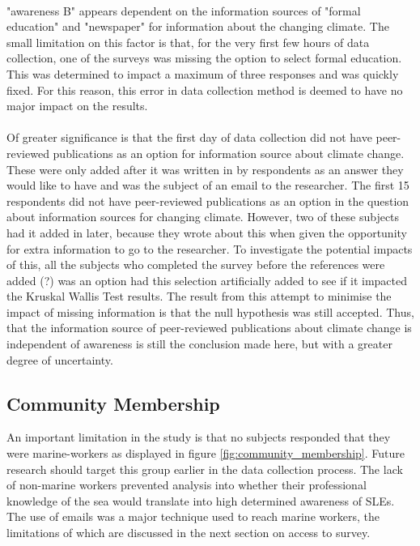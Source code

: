 \paragraph{}
"awareness B" appears dependent on the information sources of "formal education" and "newspaper" for information about the changing climate. The small limitation on this factor is that, for the very first few hours of data collection, one of the surveys was missing the option to select formal education. This was determined to impact a maximum of three responses and was quickly fixed. For this reason, this error in data collection method is deemed to have no major impact on the results. 
\paragraph{}
Of greater significance is that the first day of data collection did not have peer-reviewed publications as an option for information source about climate change. These were only added after it was written in by respondents as an answer they would like to have and was the subject of an email to the researcher.  The first 15 respondents did not have peer-reviewed publications as an option in the question about information sources for changing climate. However, two of these subjects had it added in later, because they wrote about this when given the opportunity for extra information to go to the researcher. To investigate the potential impacts of this, all the subjects who completed the survey before the references were added (?) was an option had this selection artificially added to see if it impacted the Kruskal Wallis Test results. The result from this attempt to minimise the impact of missing information is that the null hypothesis was still accepted. Thus, that the information source of peer-reviewed publications about climate change is independent of awareness is still the conclusion made here, but with a greater degree of uncertainty.
\paragraph{}


\subsection{Community Membership}
An important limitation in the study is that no subjects responded that they were marine-workers as displayed in figure \ref{fig:community_membership}. Future research should target this group earlier in the data collection process. The lack of non-marine workers prevented analysis into whether their professional knowledge of the sea would translate into high determined awareness of SLEs. The use of emails was a major technique used to reach marine workers, the limitations of which are discussed in the next section on access to survey. 

